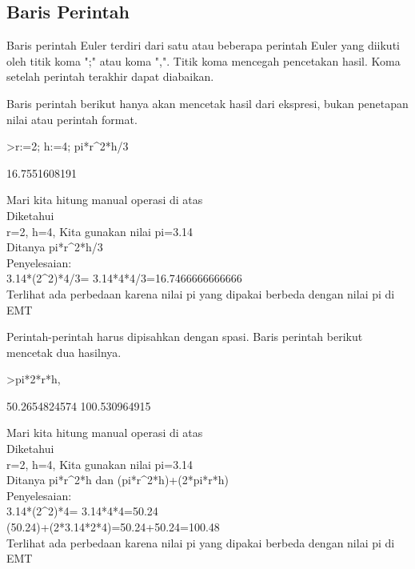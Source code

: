 \documentclass{article}
\newenvironment{eulernotebook}{\par}{\par}
\newcommand{\eulersubheading}[1]{\subsection{#1}}
\newenvironment{eulercomment}{\par\medskip}{\par\medskip}
\begin{document}
\begin{eulernotebook}
\begin{eulercomment}
\end{eulercomment}
\eulersubheading{Baris Perintah}
\begin{eulercomment}
Baris perintah Euler terdiri dari satu atau beberapa perintah Euler
yang diikuti oleh titik koma ";" atau koma ",". Titik koma mencegah
pencetakan hasil. Koma setelah perintah terakhir dapat diabaikan.

Baris perintah berikut hanya akan mencetak hasil dari ekspresi, bukan
penetapan nilai atau perintah format.
\end{eulercomment}
\begin{eulerprompt}
>r:=2; h:=4; pi*r^2*h/3
\end{eulerprompt}
\begin{euleroutput}
  16.7551608191
\end{euleroutput}
\begin{eulercomment}
Mari kita hitung manual operasi di atas\\
Diketahui\\
r=2, h=4, Kita gunakan nilai pi=3.14\\
Ditanya pi*r\textasciicircum{}2*h/3\\
Penyelesaian:\\
3.14*(2\textasciicircum{}2)*4/3= 3.14*4*4/3=16.7466666666666\\
Terlihat ada perbedaan karena nilai pi yang dipakai berbeda dengan
nilai pi di EMT

Perintah-perintah harus dipisahkan dengan spasi. Baris perintah
berikut mencetak dua hasilnya.
\end{eulercomment}
\begin{eulerprompt}
>pi*2*r*h, %
\end{eulerprompt}
\begin{euleroutput}
  50.2654824574
  100.530964915
\end{euleroutput}
\begin{eulercomment}
Mari kita hitung manual operasi di atas\\
Diketahui\\
r=2, h=4, Kita gunakan nilai pi=3.14\\
Ditanya pi*r\textasciicircum{}2*h dan (pi*r\textasciicircum{}2*h)+(2*pi*r*h)\\
Penyelesaian:\\
3.14*(2\textasciicircum{}2)*4= 3.14*4*4=50.24\\
(50.24)+(2*3.14*2*4)=50.24+50.24=100.48\\
Terlihat ada perbedaan karena nilai pi yang dipakai berbeda dengan
nilai pi di EMT


\end{eulercomment}
\end{eulernotebook}
\end{document}
